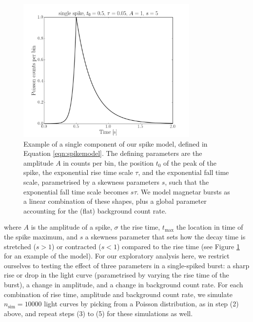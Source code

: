 \documentclass[numberedappendix]{emulateapj}
\begin{document}
\begin{figure}[htbp]
\begin{center}
\includegraphics[width=9cm]{f4.pdf}
\caption{Example of a single component of our spike model, defined in Equation \ref{eqn:spikemodel}. The defining parameters are the amplitude $A$ in counts per bin, the position $t_0$ of the peak of the spike,  the exponential rise time scale $\tau$, and the exponential fall time scale, parametrised by a skewness parameters $s$, such that the exponential fall time scale becomes $s\tau$. We model magnetar bursts as a linear combination of these shapes, plus a global parameter accounting for the (flat) background count rate.}
\label{fig:example_spike}
\end{center}
\end{figure}

where $A$ is the amplitude of a spike, $\sigma$ the rise time, $t_\mathrm{max}$ the location in time of the spike maximum, and $s$ a skewness parameter that sets how the decay time is stretched ($s > 1$) or contracted ($s < 1$) compared to the rise time (see Figure \ref{fig:example_spike} for an example of the model). 
For our exploratory analysis here, we restrict ourselves to testing the effect of three parameters in a single-spiked burst: a sharp rise or drop in the light curve (parametrised by varying the rise time of the burst), a change in amplitude, and a change in background count rate. For each combination of rise time, amplitude and 
background count rate, we simulate $n_{\mathrm{sim}} = 10000$  light curves by picking from a Poisson distribution, as in step (2) above, and repeat steps (3) to (5) for these simulations as well. 
\end{document}
